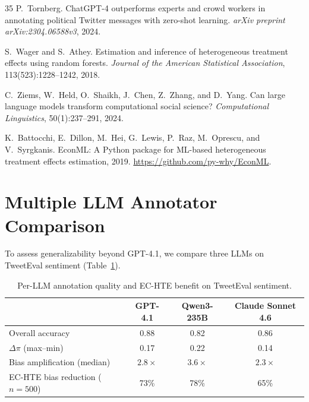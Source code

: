\documentclass[11pt,twocolumn]{article}
\theoremstyle{remark}
\begin{document}
\begin{thebibliography}{35}
P.~Tornberg.
\newblock ChatGPT-4 outperforms experts and crowd workers in annotating political Twitter messages with zero-shot learning.
\newblock \emph{arXiv preprint arXiv:2304.06588v3}, 2024.

S.~Wager and S.~Athey.
\newblock Estimation and inference of heterogeneous treatment effects using random forests.
\newblock \emph{Journal of the American Statistical Association}, 113(523):1228--1242, 2018.

C.~Ziems, W.~Held, O.~Shaikh, J.~Chen, Z.~Zhang, and D.~Yang.
\newblock Can large language models transform computational social science?
\newblock \emph{Computational Linguistics}, 50(1):237--291, 2024.

K.~Battocchi, E.~Dillon, M.~Hei, G.~Lewis, P.~Raz, M.~Oprescu, and V.~Syrgkanis.
\newblock EconML: A Python package for ML-based heterogeneous treatment effects estimation, 2019.
\newblock \url{https://github.com/py-why/EconML}.

\end{thebibliography}

\onecolumn
\appendix

\section{Multiple LLM Annotator Comparison}\label{app:multi_llm}

To assess generalizability beyond GPT-4.1, we compare three LLMs on TweetEval sentiment (Table~\ref{tab:multi_llm}).

\begin{table}[h]
\centering
\caption{Per-LLM annotation quality and EC-HTE benefit on TweetEval sentiment.}
\label{tab:multi_llm}
\begin{tabular}{lccc}
\toprule
& GPT-4.1 & Qwen3-235B & Claude Sonnet 4.6 \\
\midrule
Overall accuracy & 0.88 & 0.82 & 0.86 \\
$\Delta\pi$ (max--min) & 0.17 & 0.22 & 0.14 \\
Bias amplification (median) & $2.8\times$ & $3.6\times$ & $2.3\times$ \\
EC-HTE bias reduction ($n{=}500$) & 73\% & 78\% & 65\% \\
\bottomrule
\end{tabular}
\end{table}
\end{document}
